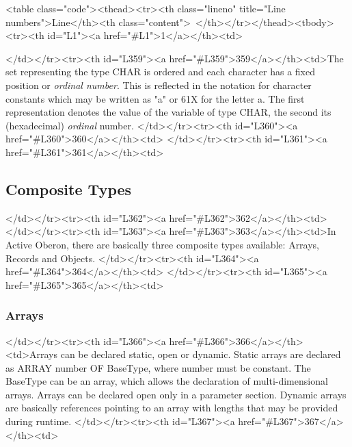 <table class="code"><thead><tr><th class="lineno" title="Line numbers">Line</th><th class="content"> </th></tr></thead><tbody><tr><th id="L1"><a href="#L1">1</a></th><td>\documentclass[a4paper,11pt]{article}
\begin{document}
</td></tr><tr><th id="L359"><a href="#L359">359</a></th><td>The set representing the type CHAR is ordered and each character has a fixed position or {\em ordinal number}. This is reflected in the notation for character constants which may be written as "a" or 61X for the letter a. The first representation denotes the value of the variable of type CHAR, the second its (hexadecimal) {\em ordinal} number.
</td></tr><tr><th id="L360"><a href="#L360">360</a></th><td>
</td></tr><tr><th id="L361"><a href="#L361">361</a></th><td>\subsection{Composite Types}\label{section:CompositeTypes}
</td></tr><tr><th id="L362"><a href="#L362">362</a></th><td>
</td></tr><tr><th id="L363"><a href="#L363">363</a></th><td>In Active Oberon, there are basically three composite types available: Arrays, Records and Objects.
</td></tr><tr><th id="L364"><a href="#L364">364</a></th><td>
</td></tr><tr><th id="L365"><a href="#L365">365</a></th><td>\subsubsection{Arrays}\label{section:Arrays}
</td></tr><tr><th id="L366"><a href="#L366">366</a></th><td>Arrays can be declared static, open or dynamic. Static arrays are declared as ARRAY number OF BaseType, where number must be constant. The BaseType can be an array, which allows the declaration of multi-dimensional arrays. Arrays can be declared open only in a parameter section. Dynamic arrays are basically references pointing to an array with lengths that may be provided during runtime.
</td></tr><tr><th id="L367"><a href="#L367">367</a></th><td>
\end{document}
